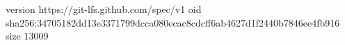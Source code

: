 version https://git-lfs.github.com/spec/v1
oid sha256:34705182dd13e3371799dcca080ecac8cdcff6ab4627d1f2440b7846ee4fb916
size 13009
